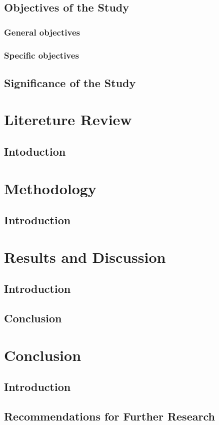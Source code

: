 \documentclass[12pt,a4paper,twoside]{Thesis}
\begin{document}
\section{Objectives of the Study}
\subsection{General objectives}
\subsection{Specific objectives}
\section{Significance of the Study}
\chapter{Litereture Review}
\section{Intoduction}
\chapter{Methodology}
\section{Introduction}
\chapter{Results and Discussion}
\section{Introduction}
\section{Conclusion}
\chapter{Conclusion}
\section{Introduction}
\section{Recommendations for Further Research}
\end{document}
